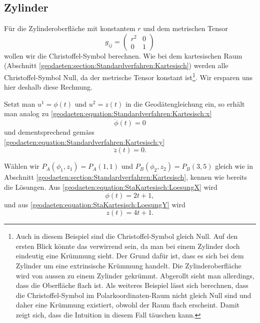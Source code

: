 %
%
%
%
\subsection{Zylinder\label{geodaeten:section:Standardverfahren:Zylinder}}

Für die Zylinderoberfläche mit konstantem $r$ und dem metrischen Tensor 
\begin{equation}
	g_{ij} = \begin{pmatrix} 
		r^2 & 0 \\ 
		0 & 1 
	\end{pmatrix}
\end{equation}
wollen wir die Christoffel-Symbol berechnen. 
Wie bei dem kartesischen Raum (Abschnitt \ref{geodaeten:section:Standardverfahren:Kartesisch}) werden alle Christoffel-Symbol Null, da der metrische Tensor konstant ist\footnote{
Auch in diesem Beispiel sind die Christoffel-Symbol gleich Null.
Auf den ersten Blick könnte das verwirrend sein, da man bei einem Zylinder doch eindeutig eine Krümmung sieht.
Der Grund dafür ist, dass es sich bei dem Zylinder um eine extrinsische Krümmung handelt.
Die Zylinderoberfläche wird von aussen zu einem Zylinder gekrümmt.
Abgerollt sieht man allerdings, dass die Oberfläche flach ist.
Als weiteres Beispiel lässt sich berechnen, dass die Christoffel-Symbol im Polarkoordinaten-Raum nicht gleich Null sind und daher eine Krümmung existiert, obwohl der Raum flach erscheint.
Damit zeigt sich, dass die Intuition in diesem Fall täuschen kann.
}.
Wir ersparen uns hier deshalb diese Rechnung.

Setzt man $u^1 = \phi (t)$ und $u^2 = z(t)$ in die Geodätengleichung ein, so erhält man analog zu \eqref{geodaeten:equation:Standardverfahren:Kartesisch:x}
\begin{equation}
	\ddot{\phi}(t) = 0
	\label{geodaeten:equation:Standardverfahren:Zylinder:phi}
\end{equation}
und dementsprechend gemäss \eqref{geodaeten:equation:Standardverfahren:Kartesisch:y}
\begin{equation}
	\ddot{z}(t) = 0 .
\end{equation}


Wählen wir $P_A(\phi_1 , z_1) = P_A(1 , 1)$ und $P_B(\phi_2 , z_2) = P_B(3 , 5)$ gleich wie in Abschnitt \ref{geodaeten:section:Standardverfahren:Kartesisch}, kennen wie bereits die Lösungen. 
Aus \eqref{geodaeten:equation:StaKartesisch:LoesungX} wird 
\begin{equation}
	\phi(t) = 2t + 1 ,
\end{equation}
und aus \eqref{geodaeten:equation:StaKartesisch:LoesungY} wird
\begin{equation}
	z(t) = 4t + 1 .
\end{equation}

